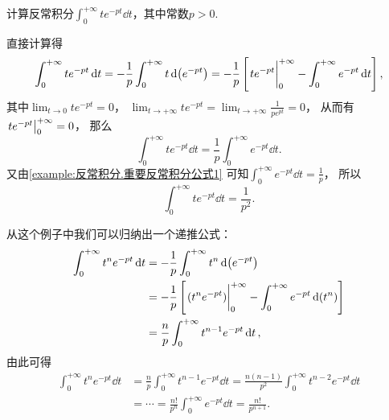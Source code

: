 \begin{example}
计算反常积分\(\int_0^{+\infty} t e^{-pt} \dd{t}\)，其中常数\(p>0\).
\begin{solution}
直接计算得\[
	\int_0^{+\infty} t e^{-pt} \dd{t}
	= -\frac1p \int_0^{+\infty} t \dd(e^{-pt}) %
	= -\frac1p \left[
		\eval{t e^{-pt}}_0^{+\infty}
		- \int_0^{+\infty} e^{-pt} \dd{t}
	\right],
\]
其中\(\lim_{t\to0} t e^{-pt} = 0\)，%
\(\lim_{t\to+\infty} t e^{-pt}
= \lim_{t\to+\infty} \frac1{p e^{pt}} %
= 0\)，
从而有\(\eval{t e^{-pt}}_0^{+\infty} = 0\)，
那么\[
	\int_0^{+\infty} t e^{-pt} \dd{t}
	= \frac1p \int_0^{+\infty} e^{-pt} \dd{t}.
\]
又由\cref{example:反常积分.重要反常积分公式1}
可知\(\int_0^{+\infty} e^{-pt} \dd{t} = \frac1p\)，
所以\[
	\int_0^{+\infty} t e^{-pt} \dd{t}
	= \frac1{p^2}.
\]
\end{solution}
\end{example}
\begin{remark}
从这个例子中我们可以归纳出一个递推公式：\begin{align*}
	\int_0^{+\infty} t^n e^{-pt} \dd{t}
	&= -\frac1p \int_0^{+\infty} t^n \dd(e^{-pt}) \\
	&= -\frac1p \left[\eval{(t^n e^{-pt})}_0^{+\infty} - \int_0^{+\infty} e^{-pt} \dd(t^n)\right] \\
	&= \frac{n}{p} \int_0^{+\infty} t^{n-1} e^{-pt} \dd{t},
\end{align*}
由此可得\begin{align*}
	\int_0^{+\infty} t^n e^{-pt} \dd{t}
	&= \frac{n}{p} \int_0^{+\infty} t^{n-1} e^{-pt} \dd{t}
	= \frac{n(n-1)}{p^2} \int_0^{+\infty} t^{n-2} e^{-pt} \dd{t} \\
	&= \dotsb = \frac{n!}{p^n} \int_0^{+\infty} e^{-pt} \dd{t}
	= \frac{n!}{p^{n+1}}.
\end{align*}
\end{remark}

